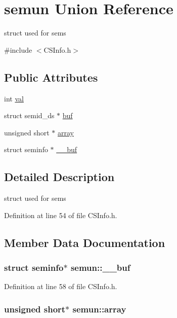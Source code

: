 \hypertarget{unionsemun}{
\section{semun Union Reference}
\label{unionsemun}
}


struct used for sems  


{\ttfamily \#include $<$CSInfo.h$>$}\subsection*{Public Attributes}
\begin{DoxyCompactItemize}
\item 
int \hyperlink{unionsemun_ac6121ecb6d04a024e07e12bd71b94031}{val}
\item 
struct semid\_\-ds $\ast$ \hyperlink{unionsemun_ac6b6428d07d4147fd2cc698b53555bed}{buf}
\item 
unsigned short $\ast$ \hyperlink{unionsemun_aca23b8e730a0553205813c0cb7692b54}{array}
\item 
struct seminfo $\ast$ \hyperlink{unionsemun_aa0ac6a1a9174a4ae355bc367e7e64780}{\_\-\_\-buf}
\end{DoxyCompactItemize}


\subsection{Detailed Description}
struct used for sems 

Definition at line 54 of file CSInfo.h.

\subsection{Member Data Documentation}
\hypertarget{unionsemun_aa0ac6a1a9174a4ae355bc367e7e64780}{
\subsubsection[{\_\-\_\-buf}]{\setlength{\rightskip}{0pt plus 5cm}struct seminfo$\ast$ {\bf semun::\_\-\_\-buf}}}
\label{unionsemun_aa0ac6a1a9174a4ae355bc367e7e64780}


Definition at line 58 of file CSInfo.h.\hypertarget{unionsemun_aca23b8e730a0553205813c0cb7692b54}{
\subsubsection[{array}]{\setlength{\rightskip}{0pt plus 5cm}unsigned short$\ast$ {\bf semun::array}}}
\label{unionsemun_aca23b8e730a0553205813c0cb7692b54}


